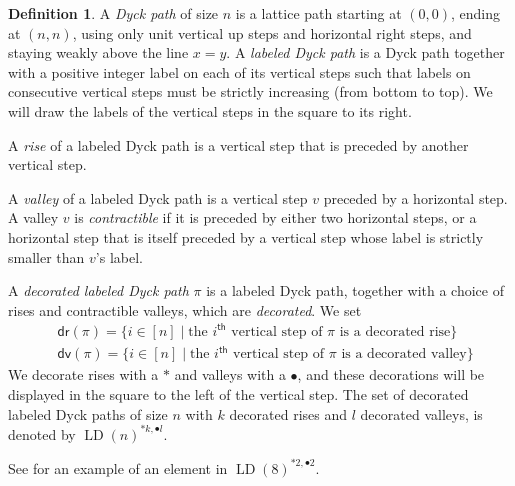 \documentclass[reqno]{amsart}
\theoremstyle{plain}
\theoremstyle{definition}
\newtheorem{definition}[theorem]{Definition}
\theoremstyle{remark}
\renewcommand{\th}{^\mathsf{th}}
\DeclareMathOperator{\LD}{LD}
\newcommand{\<}{\langle}
\renewcommand{\>}{\rangle}
\begin{document}
\begin{definition}
    A \emph{Dyck path} of size $n$ is a lattice path starting at $(0,0)$, ending at $(n,n)$, using only unit vertical up steps and horizontal right steps, and staying weakly above the line $x=y$. A \emph{labeled Dyck path} is a Dyck path together with a positive integer label on each of its vertical steps such that labels on consecutive vertical steps must be strictly increasing (from bottom to top). We will draw the labels of the vertical steps in the square to its right.

    A \emph{rise} of a labeled Dyck path is a vertical step that is preceded by another vertical step.

    A \emph{valley} of a labeled Dyck path is a vertical step $v$ preceded by a horizontal step. A valley $v$ is \emph{contractible} if it is preceded by either two horizontal steps, or a horizontal step that is itself preceded by a vertical step whose label is strictly smaller than $v$'s label.

    A \emph{decorated labeled Dyck path} $\pi$ is a labeled Dyck path, together with a choice of rises and contractible valleys, which are \emph{decorated}.
    We set
    \begin{align*}
         & \mathsf{dr}(\pi) = \{i \in [n] \mid \text{the $i\th$ vertical step of $\pi$ is a decorated rise}\}     \\
         & \mathsf{dv}(\pi) = \{i \in [n] \mid \text{the $i\th$ vertical step of $\pi$ is a decorated valley}\}
    \end{align*}
    We decorate rises with a $\ast$ and valleys with a $\bullet$, and these decorations will be displayed in the square to the left of the vertical step. The set of decorated labeled Dyck paths of size $n$ with $k$ decorated rises and $l$ decorated valleys, is denoted by $\LD(n)^{\ast k, \bullet l}$.
\end{definition}

See  for an example of an element in $\LD(8)^{\ast 2, \bullet 2}$.
\end{document}
